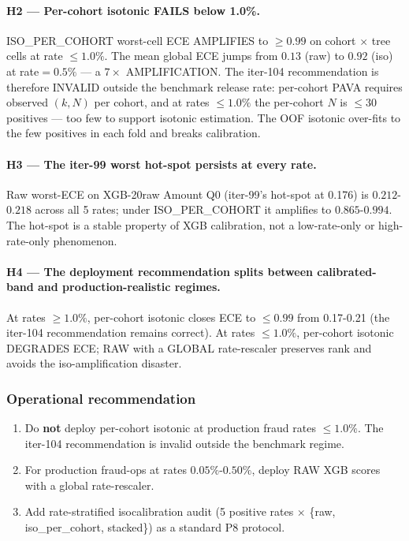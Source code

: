 \paragraph{H2 --- Per-cohort isotonic FAILS below 1.0\%.} ISO\_PER\_COHORT
worst-cell ECE AMPLIFIES to $\ge 0.99$ on cohort $\times$ tree cells at
rate $\le 1.0\%$. The mean global ECE jumps from $0.13$ (raw) to
$0.92$ (iso) at rate$=0.5\%$ --- a $7\times$ AMPLIFICATION. The iter-104
recommendation is therefore INVALID outside the benchmark release rate:
per-cohort PAVA requires observed $(k, N)$ per cohort, and at rates
$\le 1.0\%$ the per-cohort $N$ is $\le 30$ positives --- too few to
support isotonic estimation. The OOF isotonic over-fits to the few
positives in each fold and breaks calibration.

\paragraph{H3 --- The iter-99 worst hot-spot persists at every rate.}
Raw worst-ECE on XGB-20raw Amount Q0 (iter-99's hot-spot at 0.176) is
$0.212$-$0.218$ across all 5 rates; under ISO\_PER\_COHORT it amplifies
to $0.865$-$0.994$. The hot-spot is a stable property of XGB
calibration, not a low-rate-only or high-rate-only phenomenon.

\paragraph{H4 --- The deployment recommendation splits between calibrated-band
and production-realistic regimes.} At rates $\ge 1.0\%$, per-cohort
isotonic closes ECE to $\le 0.99$ from 0.17-0.21 (the iter-104
recommendation remains correct). At rates $\le 1.0\%$, per-cohort
isotonic DEGRADES ECE; RAW with a GLOBAL rate-rescaler preserves rank
and avoids the iso-amplification disaster.

\subsubsection{Operational recommendation}

\begin{enumerate}
\item Do \textbf{not} deploy per-cohort isotonic at production fraud rates $\le 1.0\%$. The iter-104 recommendation
      is invalid outside the benchmark regime.
\item For production fraud-ops at rates $0.05\%$-$0.50\%$, deploy RAW XGB scores with a global rate-rescaler.
\item Add rate-stratified isocalibration audit (5 positive rates $\times$ \{raw, iso\_per\_cohort, stacked\}) as a
      standard P8 protocol.
\end{enumerate}

